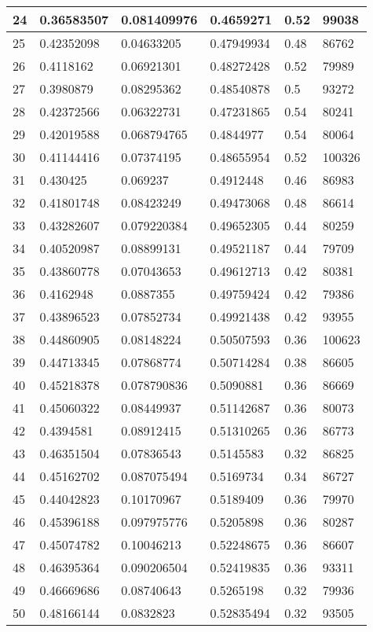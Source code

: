 \begin{longtable}{|l|l|l|l|l|l|}
24 & 0.36583507 & 0.081409976 & 0.4659271 & 0.52 & 99038 \\ \hline 
25 & 0.42352098 & 0.04633205 & 0.47949934 & 0.48 & 86762 \\ \hline 
26 & 0.4118162 & 0.06921301 & 0.48272428 & 0.52 & 79989 \\ \hline 
27 & 0.3980879 & 0.08295362 & 0.48540878 & 0.5 & 93272 \\ \hline 
28 & 0.42372566 & 0.06322731 & 0.47231865 & 0.54 & 80241 \\ \hline 
29 & 0.42019588 & 0.068794765 & 0.4844977 & 0.54 & 80064 \\ \hline 
30 & 0.41144416 & 0.07374195 & 0.48655954 & 0.52 & 100326 \\ \hline 
31 & 0.430425 & 0.069237 & 0.4912448 & 0.46 & 86983 \\ \hline 
32 & 0.41801748 & 0.08423249 & 0.49473068 & 0.48 & 86614 \\ \hline 
33 & 0.43282607 & 0.079220384 & 0.49652305 & 0.44 & 80259 \\ \hline 
34 & 0.40520987 & 0.08899131 & 0.49521187 & 0.44 & 79709 \\ \hline 
35 & 0.43860778 & 0.07043653 & 0.49612713 & 0.42 & 80381 \\ \hline 
36 & 0.4162948 & 0.0887355 & 0.49759424 & 0.42 & 79386 \\ \hline 
37 & 0.43896523 & 0.07852734 & 0.49921438 & 0.42 & 93955 \\ \hline 
38 & 0.44860905 & 0.08148224 & 0.50507593 & 0.36 & 100623 \\ \hline 
39 & 0.44713345 & 0.07868774 & 0.50714284 & 0.38 & 86605 \\ \hline 
40 & 0.45218378 & 0.078790836 & 0.5090881 & 0.36 & 86669 \\ \hline 
41 & 0.45060322 & 0.08449937 & 0.51142687 & 0.36 & 80073 \\ \hline 
42 & 0.4394581 & 0.08912415 & 0.51310265 & 0.36 & 86773 \\ \hline 
43 & 0.46351504 & 0.07836543 & 0.5145583 & 0.32 & 86825 \\ \hline 
44 & 0.45162702 & 0.087075494 & 0.5169734 & 0.34 & 86727 \\ \hline 
45 & 0.44042823 & 0.10170967 & 0.5189409 & 0.36 & 79970 \\ \hline 
46 & 0.45396188 & 0.097975776 & 0.5205898 & 0.36 & 80287 \\ \hline 
47 & 0.45074782 & 0.10046213 & 0.52248675 & 0.36 & 86607 \\ \hline 
48 & 0.46395364 & 0.090206504 & 0.52419835 & 0.36 & 93311 \\ \hline 
49 & 0.46669686 & 0.08740643 & 0.5265198 & 0.32 & 79936 \\ \hline 
50 & 0.48166144 & 0.0832823 & 0.52835494 & 0.32 & 93505 \\ \hline 
\end{longtable}